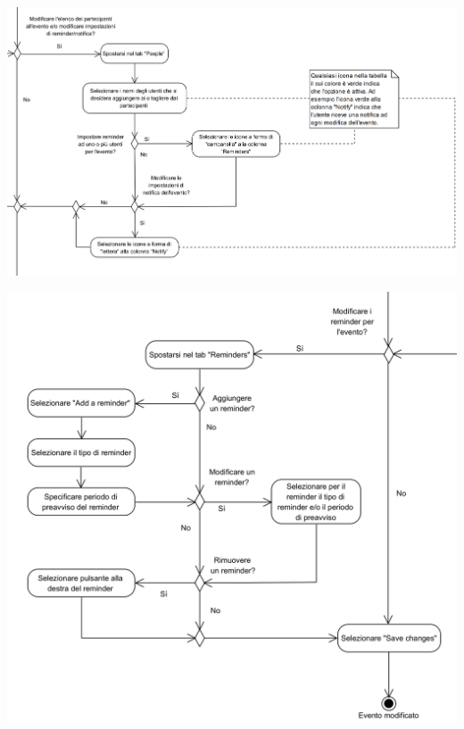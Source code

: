 \begin{center}
	\includegraphics[width=15cm]{../../documenti/NormeDiProgetto/DiagrammiProcedure/EditEventi3.png}
\end{center}

\begin{center}
	\includegraphics[width=15cm]{../../documenti/NormeDiProgetto/DiagrammiProcedure/EditEventi4.png}
\end{center}

